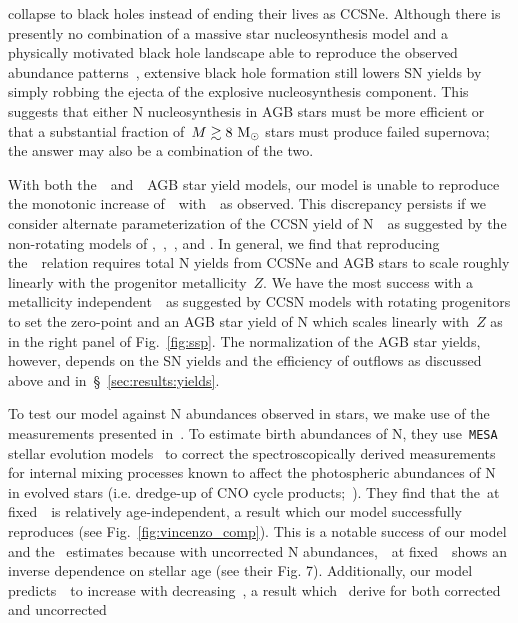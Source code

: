 \documentclass[ms.tex]{subfiles}
\begin{document}
collapse to black holes instead of ending their lives as CCSNe.
Although there is presently no combination of a massive star nucleosynthesis
model and a physically motivated black hole landscape able to reproduce the
observed abundance patterns~\citep{Griffith2021a}, extensive black hole
formation still lowers SN yields by simply robbing the ejecta of the explosive
nucleosynthesis component.
This suggests that either N nucleosynthesis in AGB stars must be more efficient 
or that a substantial fraction of~$M \gtrsim 8~\text{M}_\odot$ stars must produce
failed supernova; the answer may also be a combination of the two.
\par
With both the~\karakasten~and~\karakas~AGB star yield models, our model is
unable to reproduce the monotonic increase of~\no~with~\oh~as observed.
This discrepancy persists if we consider alternate parameterization of the
CCSN yield of N~~as suggested by the non-rotating models of
\citet{Woosley1995},~\citet{Nomoto2013},~\citet{Sukhbold2016}, and
\citet{Limongi2018}.
In general, we find that reproducing the~\ohno~relation requires total N
yields from CCSNe and AGB stars to scale roughly linearly with the progenitor
metallicity~$Z$.
We have the most success with a metallicity independent~~as suggested
by CCSN models with rotating progenitors to set the zero-point and an AGB
star yield of N which scales linearly with~$Z$ as in the right panel of
Fig.~\ref{fig:ssp}.
The normalization of the AGB star yields, however, depends on the SN yields and
the efficiency of outflows as discussed above and
in~\S~\ref{sec:results:yields}.
\par
To test our model against N abundances observed in stars, we make use of the
measurements presented in~\citet{Vincenzo2021}.
To estimate birth abundances of N, they use~\texttt{MESA} stellar evolution
models~\citep{Paxton2011, Paxton2013, Paxton2015, Paxton2018} to correct the
spectroscopically derived measurements for internal mixing processes known to
affect the photospheric abundances of N in evolved stars (i.e. dredge-up of
CNO cycle products;~\citealp{Gilroy1989, Korn2007, Lind2008, Souto2018,
Souto2019}).
They find that the~\no at fixed~\feh~is relatively age-independent, a result
which our model successfully reproduces (see Fig.~\ref{fig:vincenzo_comp}).
This is a notable success of our model and the~\citet{Vincenzo2021} estimates
because with uncorrected N abundances,~\no~at fixed~\feh~shows an inverse
dependence on stellar age (see their Fig. 7).
Additionally, our model predicts~\no~to increase with decreasing~\ofe, a
result which~\citet{Vincenzo2021} derive for both corrected and uncorrected
\end{document}
